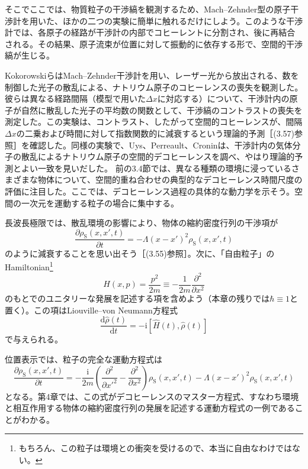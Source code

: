 \hypertarget{srcpage:139}{}\label{srcpage:139}
そこでここでは、物質粒子の干渉縞を観測するため、Mach--Zehnder型の原子干渉計を用いた、ほかの二つの実験に簡単に触れるだけにしよう\cite{ref170}。このような干渉計では、各原子の経路が干渉計の内部でコヒーレントに分割され、後に再結合される。その結果、原子流束が位置に対して振動的に依存する形で、空間的干渉縞が生じる。

Kokorowskiら\cite{ref171}はMach--Zehnder干渉計を用い、レーザー光から放出される、数を制御した光子の散乱による、ナトリウム原子のコヒーレンスの喪失を観測した。彼らは異なる経路間隔（模型で用いた$\Delta x$に対応する）について、干渉計内の原子が自然に散乱した光子の平均数の関数として、干渉縞のコントラストの喪失を測定した。この実験は、コントラスト、したがって空間的コヒーレンスが、間隔$\Delta x$の二乗および時間に対して指数関数的に減衰するという理論的予測［(3.57)参照］を確認した。同様の実験で、Uys、Perreault、Cronin\cite{ref172}は、干渉計内の気体分子の散乱によるナトリウム原子の空間的デコヒーレンスを調べ、やはり理論的予測とよい一致を見いだした。
前の3.4節では、異なる種類の環境に浸っているさまざまな物体について、空間的重ね合わせの典型的なデコヒーレンス時間尺度の評価に注目した。ここでは、デコヒーレンス過程の具体的な動力学を示そう。空間の一次元を運動する粒子の場合に集中する。

長波長極限では、散乱環境の影響により、物体の縮約密度行列の干渉項が
\begin{equation}
\frac{\partial\rho_{\mathrm S}(x,x',t)}{\partial t}=-\Lambda(x-x')^2\rho_{\mathrm S}(x,x',t)
\tag{3.75}
\end{equation}
のように減衰することを思い出そう［(3.55)参照］。次に、「自由粒子」のHamiltonian\footnote{もちろん、この粒子は環境との衝突を受けるので、本当に自由なわけではない。}
\begin{equation}
H(x,p)=\frac{p^2}{2m}\equiv-\frac{1}{2m}\frac{\partial^2}{\partial x^2}
\tag{3.76}
\end{equation}
のもとでのユニタリーな発展を記述する項を含めよう（本章の残りでは$\hbar\equiv1$と置く）。この項はLiouville--von Neumann方程式
\begin{equation}
\frac{\mathrm d\hat\rho(t)}{\mathrm dt}=-\mathrm i[\hat H(t),\hat\rho(t)]
\tag{3.77}
\end{equation}
で与えられる。

\hypertarget{srcpage:140}{}\label{srcpage:140}
位置表示では、粒子の完全な運動方程式は
\begin{equation}
\frac{\partial\rho_{\mathrm S}(x,x',t)}{\partial t}
=-\frac{\mathrm i}{2m}\left(\frac{\partial^2}{\partial x'^2}-\frac{\partial^2}{\partial x^2}\right)\rho_{\mathrm S}(x,x',t)
-\Lambda(x-x')^2\rho_{\mathrm S}(x,x',t)
\tag{3.78}
\end{equation}
となる。第4章では、この式がデコヒーレンスのマスター方程式、すなわち環境と相互作用する物体の縮約密度行列の発展を記述する運動方程式の一例であることがわかる。

